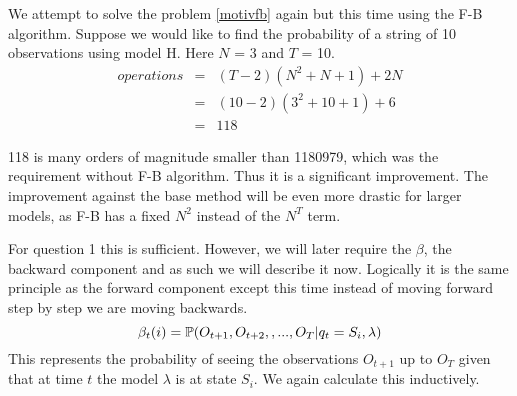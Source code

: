 \begin{example}
    \label{motivfb}
    We attempt to solve the problem \ref{motivfb} again but this time using the F-B algorithm. Suppose we would like to find the probability of a string of 10 observations using model H. Here $N$ = 3 and $T$ = 10. 
    \begin{eqnarray}
        operations & = & (T-2)(N^2 + N + 1) + 2N \\
                   & = & (10-2)(3^2 + 10 + 1) + 6\\
                   & = & 118
    \end{eqnarray}

    118 is many orders of magnitude smaller than 1180979, which was the requirement without F-B algorithm. Thus it is a significant improvement. The improvement against the base method will be even more drastic for larger models, as F-B has a fixed $N^2$ instead of the $N^T$ term.  
\end{example}


For question 1 this is sufficient. However, we will later require the $\beta$, the backward component and as such we will describe it now. Logically it is the same principle as the forward component except this time instead of moving forward step by step we are moving backwards.
\begin{equation}
    \label{beta}
    \beta_t(i) = \mathbb{P} (O_{t+1},O_{t+2},,...,O_T | q_t=S_i, \lambda)
\end{equation}
This represents the probability of seeing the observations $O_{t+1}$ up to $O_T$ given that at time $t$ the model $\lambda$ is at state $S_i$. We again calculate this inductively.

